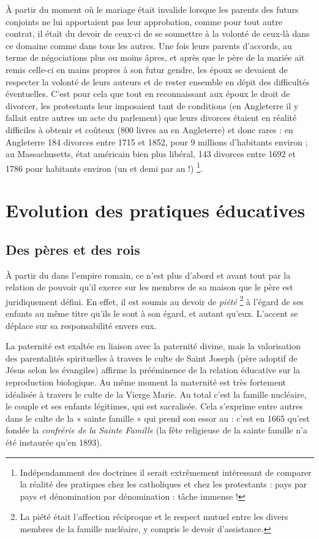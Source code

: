  À partir du moment où le mariage était invalide lorsque les parents des futurs conjoints ne lui apportaient pas leur approbation, comme pour tout autre contrat, il était du devoir de ceux-ci de se soumettre à la volonté de ceux-là dans ce domaine comme dans tous les autres. Une fois leurs parents d'accords, au terme de négociations plus ou moins âpres, et après que le père de la mariée ait remis celle-ci en mains propres à son futur gendre, les époux se devaient de respecter la volonté de leurs auteurs et de rester ensemble en dépit des difficultés éventuelles. C'est pour cela que tout en reconnaissant aux époux le droit de divorcer, les protestants leur imposaient tant de conditions (en Angleterre il y fallait entre autres un acte du parlement) que leurs divorces étaient en réalité difficiles à obtenir et coûteux (800 livres au  en Angleterre) et donc rares : en Angleterre 184 divorces entre 1715 et 1852, pour 9 millions d'habitants environ ; au Massachusetts, état américain bien plus libéral, 143 divorces entre 1692 et 1786 pour  habitants environ (un et demi par an !) 
 \footnote{Indépendamment des doctrines il serait extrêmement intéressant de comparer la réalité des pratiques chez les catholiques et chez les protestants : pays par pays et dénomination par dénomination : tâche immense !}. 

\chapter{Evolution des pratiques éducatives}


 \section{Des pères et des rois}


À partir du  dans l'empire romain, ce n'est plus d'abord et avant tout par la relation de pouvoir qu'il exerce sur les membres de sa maison que le père est juridiquement défini. En effet, il est soumis au devoir de \emph{piété} 
\footnote{La piété était l'affection réciproque et le respect mutuel entre les divers membres de la famille nucléaire, y compris le devoir d'assistance.} 
à l'égard de ses enfants au même titre qu'ils le sont à son égard, et autant qu'eux. L'accent se déplace sur sa responsabilité envers eux. 

La paternité est exaltée en liaison avec la paternité divine, mais la valorisation des parentalités spirituelles à travers le culte de Saint Joseph (père adoptif de Jésus selon les évangiles) affirme la prééminence de la relation éducative sur la reproduction biologique. Au même moment la maternité est très fortement idéalisée à travers le culte de la Vierge Marie. Au total c'est la famille nucléaire, le couple et ses enfants légitimes, qui est sacralisée. Cela s'exprime entre autres dans le culte de la « sainte famille » qui prend son essor au  : c'est en 1665 qu'est fondée la \emph{confrérie de la Sainte Famille} (la fête religieuse de la sainte famille n'a été instaurée qu'en 1893). 


